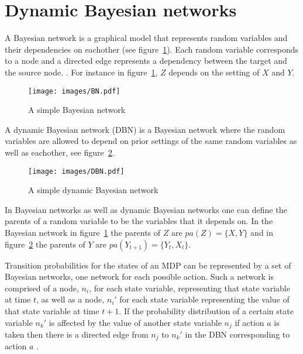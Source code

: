 \section{Dynamic Bayesian networks}
\label{sec:dbn}

A Bayesian network is a graphical model that represents random variables and
their dependencies on eachother (see figure~\ref{fig:bn}). Each random variable
corresponds to a node and a directed edge represents a dependency between the
target and the source node. \parencite{heckerman1998tutorial}. For instance in
figure~\ref{fig:bn}, $Z$ depends on the setting of $X$ and $Y$. 

\begin{figure}[H]
\centering
\texttt{[image: images/BN.pdf]}
\caption{A simple Bayesian network}
\label{fig:bn}
\end{figure}

A dynamic Bayesian network (DBN) is a Bayesian network where the random
variables are allowed to depend on prior settings of the same random variables
as well as eachother, see figure~\ref{fig:dbn}.

\begin{figure}[H]
    \centering
    \texttt{[image: images/DBN.pdf]}
    \caption{A simple dynamic Bayesian network}
    \label{fig:dbn}
\end{figure}

In Bayesian networks as well as dynamic Bayesian networks one can define the
parents of a random variable to be the variables that it depends on. In the
Bayesian network in figure~\ref{fig:bn} the parents of $Z$ are $pa(Z) = \{X,
Y\}$ and in figure~\ref{fig:dbn} the parents of $Y$ are $pa(Y_{t+1}) = \{Y_t,
X_t\}$.

Transition probabilities for the states of an MDP can be represented by a set
of Bayesian networks, one network for each possible action. Such a network is
comprised of a node, $n_i$, for each state variable, representing that state
variable at time $t$, as well as a node, $n_i'$ for each state variable
representing the value of that state variable at time $t+1$. If the probability
distribution of a certain state variable $n_k'$ is affected by the value of
another state variable $n_j$ if action $a$ is taken then there is a directed
edge from $n_j$ to $n_k'$ in the DBN corresponding to action $a$
\parencite{guestrin2003efficient}.

